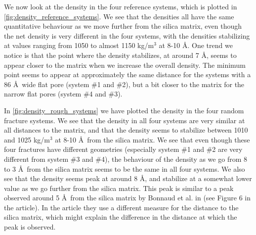 We now look at the density in the four reference systems, which is plotted in \cref{fig:density_reference_systems}. We see that the densities all have the same quantitative behaviour as we move further from the silica matrix, even though the net density is very different in the four systems, with the densities stabilizing at values ranging from 1050 to almost 1150 kg/m$^3$ at 8-10 \AA. One trend we notice is that the point where the density stabilizes, at around 7 \AA, seems to appear closer to the matrix when we increase the overall density. The minimum point seems to appear at approximately the same distance for the systems with a 86 \AA\ wide flat pore (system \#1 and \#2), but a bit closer to the matrix for the narrow flat pores (system \#4 and \#3).

In \cref{fig:density_rough_systems} we have plotted the density in the four random fracture systems. We see that the density in all four systems are very similar at all distances to the matrix, and that the density seems to stabilize between 1010 and 1025 kg/m$^3$ at 8-10 \AA\ from the silica matrix. We see that even though these four fractures have different geometries (especially system \#1 and \#2 are very different from system \#3 and \#4), the behaviour of the density as we go from 8 to 3 \AA\ from the silica matrix seems to be the same in all four systems. We also see that the density seems peak at around 8 \AA, and stabilize at a somewhat lower value as we go further from the silica matrix. This peak is similar to a peak observed around 5 \AA\ from the silica matrix by Bonnaud et al. in \cite{bonnaud2010molecular} (see Figure 6 in the article). In the article they use a different measure for the distance to the silica matrix, which might explain the difference in the distance at which the peak is observed.

